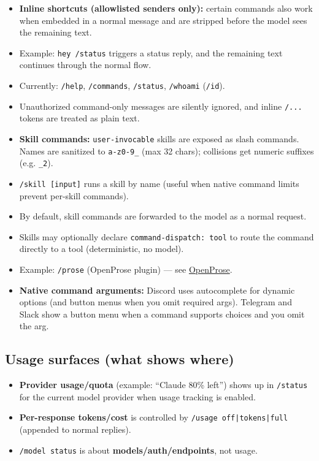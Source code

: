 \begin{itemize}
  \item \textbf{Inline shortcuts (allowlisted senders only):} certain commands also work when embedded in a normal message and are stripped before the model sees the remaining text.
  \item Example: \texttt{hey /status} triggers a status reply, and the remaining text continues through the normal flow.
  \item Currently: \texttt{/help}, \texttt{/commands}, \texttt{/status}, \texttt{/whoami} (\texttt{/id}).
  \item Unauthorized command-only messages are silently ignored, and inline \texttt{/...} tokens are treated as plain text.
  \item \textbf{Skill commands:} \texttt{user-invocable} skills are exposed as slash commands. Names are sanitized to \texttt{a-z0-9\_} (max 32 chars); collisions get numeric suffixes (e.g. \texttt{\_2}).
  \item \texttt{/skill  [input]} runs a skill by name (useful when native command limits prevent per-skill commands).
  \item By default, skill commands are forwarded to the model as a normal request.
  \item Skills may optionally declare \texttt{command-dispatch: tool} to route the command directly to a tool (deterministic, no model).
  \item Example: \texttt{/prose} (OpenProse plugin) — see \href{/prose}{OpenProse}.
  \item \textbf{Native command arguments:} Discord uses autocomplete for dynamic options (and button menus when you omit required args). Telegram and Slack show a button menu when a command supports choices and you omit the arg.
\end{itemize}


\subsection{Usage surfaces (what shows where)}


\begin{itemize}
  \item \textbf{Provider usage/quota} (example: “Claude 80\% left”) shows up in \texttt{/status} for the current model provider when usage tracking is enabled.
  \item \textbf{Per-response tokens/cost} is controlled by \texttt{/usage off|tokens|full} (appended to normal replies).
  \item \texttt{/model status} is about \textbf{models/auth/endpoints}, not usage.
\end{itemize}



